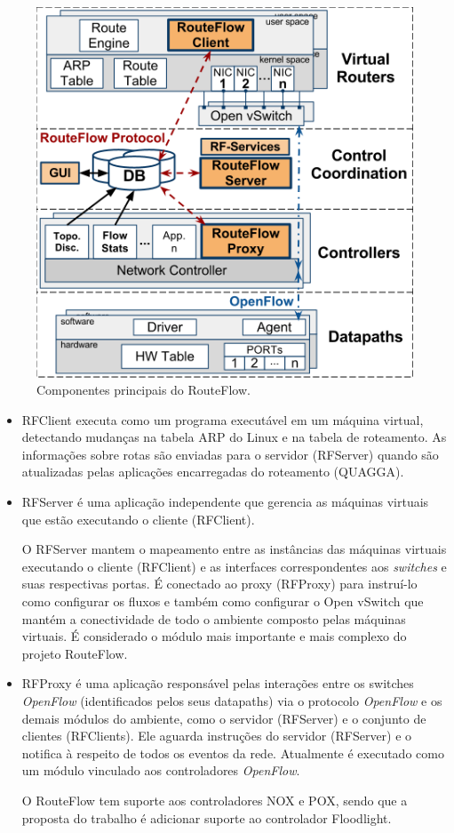 \begin{figure}[h] 
\centering
\includegraphics[width=130mm]{componentesRouteFlow.png}
\caption{Componentes principais do RouteFlow.}
\label{fig:componentesRouteFlow} 
\end{figure}


\begin{itemize} 
\item RFClient executa como um programa
executável em um máquina virtual, detectando
mudanças na tabela ARP do Linux e na tabela de roteamento.
As informações sobre rotas são enviadas para o
servidor (RFServer) quando são atualizadas pelas aplicações
encarregadas do roteamento (QUAGGA). 

\item RFServer é uma aplicação independente que gerencia as
máquinas virtuais que estão executando o cliente (RFClient). 

O RFServer mantem o mapeamento entre as instâncias das
máquinas virtuais executando o cliente (RFClient) e as interfaces
correspondentes aos \textit{switches} e suas respectivas portas. É
conectado ao proxy (RFProxy) para instruí-lo como configurar os
fluxos e também como configurar o Open vSwitch que mantém a
conectividade de todo o ambiente composto pelas máquinas virtuais.
É considerado o módulo mais importante e mais complexo
do projeto RouteFlow.

\item RFProxy é uma aplicação responsável pelas interações
entre os switches \textit{OpenFlow} (identificados pelos seus
datapaths) via o protocolo \textit{OpenFlow} e os demais
módulos do ambiente, como o servidor (RFServer) e o conjunto
de clientes (RFClients). Ele aguarda instruções
do servidor (RFServer) e o notifica à respeito de todos os eventos da rede.
Atualmente é executado como um módulo vinculado aos
controladores \textit{OpenFlow}. 

O RouteFlow tem suporte aos
controladores NOX e POX, sendo que a proposta do trabalho é
adicionar suporte ao controlador Floodlight. 
\end{itemize}

